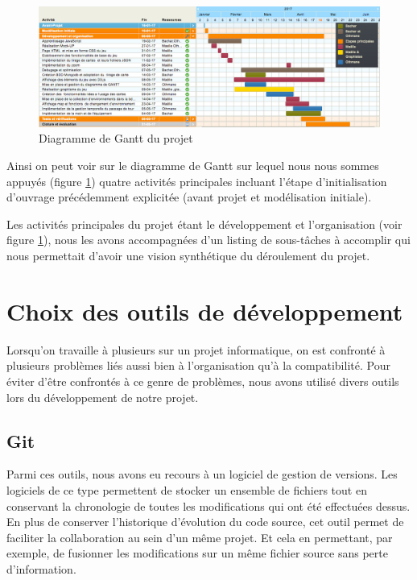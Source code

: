 \documentclass[12pt]{report}
\begin{document}
		\begin{figure}[h!]
    	\centering
	    \includegraphics[scale=0.4]{images/diagrammeGantt.jpg}
	    \caption{Diagramme de Gantt du projet}
	    \label{fig:diagGantt}
    \end{figure}

		\newpage
		Ainsi on peut voir sur le diagramme de Gantt sur lequel nous nous sommes appuyés (figure \ref{fig:diagGantt}) quatre activités principales incluant l’étape d’initialisation d’ouvrage précédemment explicitée (avant projet et modélisation initiale).

		Les activités principales du projet étant le développement et l'organisation (voir figure \ref{fig:diagGantt}), nous les avons accompagnées d’un listing de sous-tâches à accomplir qui nous permettait d’avoir une vision synthétique du déroulement du projet.

		\newpage

		\section{Choix des outils de développement}
		Lorsqu’on travaille à plusieurs sur un projet informatique, on est confronté à plusieurs problèmes liés aussi bien à l’organisation qu’à la compatibilité.
		Pour éviter d'être confrontés à ce genre de problèmes, nous avons utilisé divers outils lors du développement de notre projet.

			\subsection*{Git}
	 		Parmi ces outils, nous avons eu recours à un logiciel de gestion de versions. Les logiciels de ce type permettent  de stocker un ensemble de fichiers tout en conservant la chronologie de toutes les modifications qui ont été effectuées dessus.
	 		En plus de conserver l’historique d’évolution du code source, cet outil permet de faciliter la collaboration au sein d’un même projet. Et cela en permettant, par exemple, de fusionner les modifications sur un même fichier source sans perte d’information.
\end{document}
